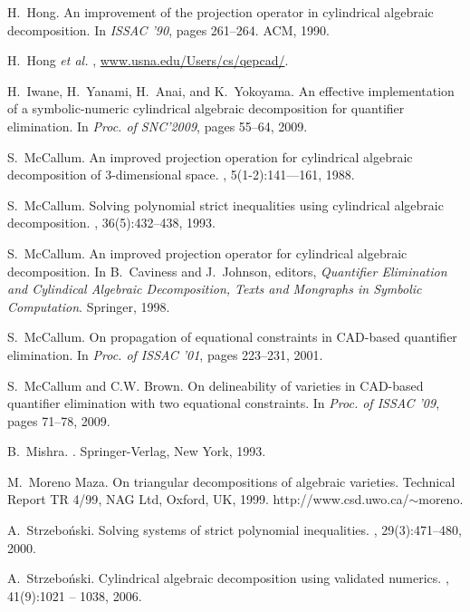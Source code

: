 \documentclass[10pt]{article}
\begin{document}
\begin{thebibliography}{10}
H.~Hong.
\newblock An improvement of the projection operator in cylindrical algebraic
  decomposition.
\newblock In {\em ISSAC '90}, pages 261--264. ACM, 1990.

H.~{Hong {\it et al.}}
, \url{www.usna.edu/Users/cs/qepcad/}.

H.~Iwane, H.~Yanami, H.~Anai, and K.~Yokoyama.
\newblock An effective implementation of a symbolic-numeric cylindrical
  algebraic decomposition for quantifier elimination.
\newblock In {\em Proc. of SNC'2009}, pages 55--64, 2009.

S.~McCallum.
\newblock An improved projection operation for cylindrical algebraic
  decomposition of 3-dimensional space.
, 5(1-2):141–--161, 1988.

S.~McCallum.
\newblock Solving polynomial strict inequalities using cylindrical algebraic
  decomposition.
, 36(5):432--438, 1993.

S.~McCallum.
\newblock An improved projection operator for cylindrical algebraic
  decomposition.
\newblock In B.~Caviness and J.~Johnson, editors, {\em Quantifier Elimination
  and Cylindical Algebraic Decomposition, Texts and Mongraphs in Symbolic
  Computation}. Springer, 1998.

S.~McCallum.
\newblock On propagation of equational constraints in {CAD}-based quantifier
  elimination.
\newblock In {\em Proc. of ISSAC '01}, pages 223--231, 2001.

S.~McCallum and C.W. Brown.
\newblock On delineability of varieties in {CAD}-based quantifier elimination
  with two equational constraints.
\newblock In {\em Proc. of ISSAC '09}, pages 71--78, 2009.

B.~Mishra.
.
\newblock Springer-Verlag, New York, 1993.

M.~{{Moreno Maza}}.
\newblock On triangular decompositions of algebraic varieties.
\newblock Technical Report TR {4/99}, NAG Ltd, Oxford, UK, 1999.
\newblock http://www.csd.uwo.ca/${\sim}$moreno.

A.~Strzebo\'{n}ski.
\newblock Solving systems of strict polynomial inequalities.
, 29(3):471--480, 2000.

A.~Strzebo\'{n}ski.
\newblock Cylindrical algebraic decomposition using validated numerics.
, 41(9):1021 -- 1038, 2006.


\end{thebibliography}
\end{document}
